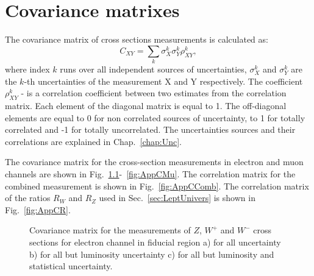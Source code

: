 \chapter{Covariance matrixes}\label{app:Cor}
The covariance matrix of cross sections measurements is calculated as:
\begin{equation}
C_{XY}=\sum_{k}\sigma^k_X\sigma^k_Y \rho^{k}_{XY},
\end{equation}
where index $k$ runs over all independent sources of uncertainties, $\sigma^k_X$ and $\sigma^k_Y$ are the $k$-th uncertainties of the measurement X and Y respectively. The coefficient $\rho^k_{XY}$ - is a correlation coefficient between two estimates from the correlation matrix. Each element of the diagonal matrix is equal to 1. The off-diagonal elements are equal to 0 for non correlated sources of uncertainty, to 1 for totally correlated and -1 for totally uncorrelated. The uncertainties sources and their correlations are explained in Chap.~\ref{chap:Unc}.

The covariance matrix for the cross-section measurements in electron and muon channels are shown in Fig.~\ref{fig:AppCE}-~\ref{fig:AppCMu}. The correlation matrix for the combined measurement is shown in Fig.~\ref{fig:AppCComb}. The correlation matrix of the ratios $R_W$ and $R_Z$ used in Sec.~\ref{sec:LeptUnivers} is shown in Fig.~\ref{fig:AppCR}.


\begin{figure}[!h]
\begin{minipage}[h]{0.32\linewidth}
\end{minipage}
\hfill
\begin{minipage}[h]{0.32\linewidth}
\end{minipage}
\hfill
\begin{minipage}[h]{0.32\linewidth}
\end{minipage}
\caption{Covariance matrix for the measurements of $Z$, $W^+$ and $W^{-}$  cross sections for electron channel in fiducial region a) for all uncertainty b) for all but luminosity uncertainty c) for all but luminosity and statistical uncertainty. }
\label{fig:AppCE}
\end{figure}

